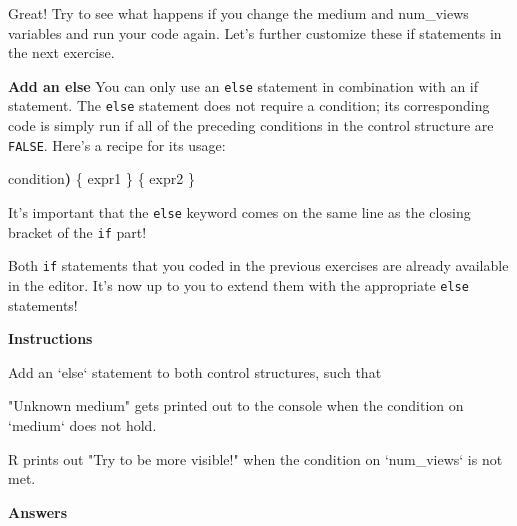 \documentclass[]{article}
\newcommand{\hlstr}[1]{\textcolor[rgb]{0.251,0.627,0.251}{#1}}%
\newcommand{\hlstd}[1]{\textcolor[rgb]{0.251,0.251,0.251}{#1}}%
\newcommand{\hlkwc}[1]{\textcolor[rgb]{0.251,0.251,0.251}{#1}}%
\newenvironment{Shaded}{\begin{myshaded}}{\end{myshaded}}
\newcommand{\DataTypeTok}[1]{\hlkwc{#1}}
\newcommand{\StringTok}[1]{\hlstr{#1}}
\newcommand{\ErrorTok}[1]{\textbf{{#1}}}
\newcommand{\NormalTok}[1]{\hlstd{#1}}
\begin{document}
Great! Try to see what happens if you change the medium and num\_views
variables and run your code again. Let's further customize these if
statements in the next exercise.

\textbf{Add an else} You can only use an \texttt{else} statement in
combination with an if statement. The \texttt{else} statement does not
require a condition; its corresponding code is simply run if all of the
preceding conditions in the control structure are \texttt{FALSE}. Here's
a recipe for its usage:

\begin{Shaded}
\begin{Highlighting}[]
\NormalTok{ condition}\ErrorTok{)}\NormalTok{ \{}
\NormalTok{expr1}
\NormalTok{\} }\NormalTok{ \{}
\NormalTok{expr2}
\NormalTok{\}}
\end{Highlighting}
\end{Shaded}

It's important that the \texttt{else} keyword comes on the same line as
the closing bracket of the \texttt{if} part!

Both \texttt{if} statements that you coded in the previous exercises are
already available in the editor. It's now up to you to extend them with
the appropriate \texttt{else} statements!

\textbf{Instructions}

\begin{Shaded}
\begin{Highlighting}[]
\NormalTok{Add an }\StringTok{`}\DataTypeTok{else}\StringTok{`}\NormalTok{ statement to both control structures, such that}

\OperatorTok{*}\StringTok{ "Unknown medium"}\NormalTok{ gets printed out to the console when the }\OperatorTok{-}\NormalTok{condition on }\StringTok{`}\DataTypeTok{medium}\StringTok{`}\NormalTok{ does not hold.}

\OperatorTok{*}\StringTok{ }\NormalTok{R prints out }\StringTok{"Try to be more visible!"}\NormalTok{ when the }\OperatorTok{-}\NormalTok{condition on }\StringTok{`}\DataTypeTok{num_views}\StringTok{`}\NormalTok{ is not met.}
\end{Highlighting}
\end{Shaded}

\textbf{Answers}
\end{document}
